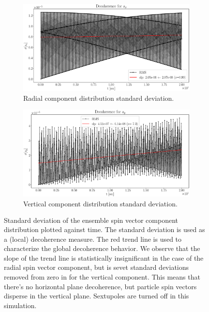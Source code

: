 \documentclass[]{elsarticle}
\begin{document}
\begin{figure}[h]\centering
  \begin{subfigure}{\linewidth}
    \includegraphics[width=\linewidth]{img/decoh/SX_decoh_20sec_unopt.eps}
    \caption{Radial component distribution standard deviation.\label{fig:decoh:imperfect:off:hor}}
  \end{subfigure}
  \begin{subfigure}{\linewidth}
    \includegraphics[width=\linewidth]{img/decoh/SY_decoh_20sec_unopt.eps}
    \caption{Vertical component distribution standard deviation.\label{fig:decoh:imperfect:off:vert}}
  \end{subfigure}
  \caption{Standard deviation of the ensemble spin vector component distribution plotted against time.
    The standard deviation is used as a (local) decoherence measure. The red trend line is used to
    characterize the global decoherence behavior.
    We observe that the slope of the trend line is statistically insignificant in the case of the radial
    spin vector component, but is sevet standard deviations removed from zero in for the vertical component.
    This means that there's no horizontal plane decoherence, but particle spin vectors disperse in the
    vertical plane.
    Sextupoles are turned off in this simulation.\label{fig:decoh:imperfect:off}}
\end{figure}
\end{document}
